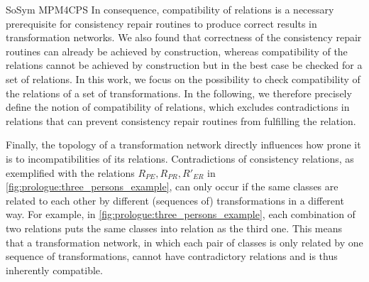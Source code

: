 \begin{copiedFrom}{SoSym MPM4CPS}
In consequence, compatibility of relations is a necessary prerequisite for consistency repair routines to produce correct results in transformation networks.
We also found that correctness of the consistency repair routines can already be achieved by construction, whereas compatibility of the relations cannot be achieved by construction but in the best case be checked for a set of relations.
In this work, we focus on the possibility to check compatibility of the relations of a set of transformations.
In the following, we therefore precisely define the notion of compatibility of relations, which excludes contradictions in relations that can prevent consistency repair routines from fulfilling the relation.


Finally, the topology of a transformation network directly influences how prone it is to incompatibilities of its relations.
Contradictions of consistency relations, as exemplified with the relations $R_{PE}, R_{PR}, R'_{ER}$ in \autoref{fig:prologue:three_persons_example}, can only occur if the same classes are related to each other by different (sequences of) transformations in a different way.
For example, in \autoref{fig:prologue:three_persons_example}, each combination of two relations puts the same classes into relation as the third one.
This means that a transformation network, in which each pair of classes is only related by one sequence of transformations, cannot have contradictory relations and is thus inherently compatible.





\end{copiedFrom}

